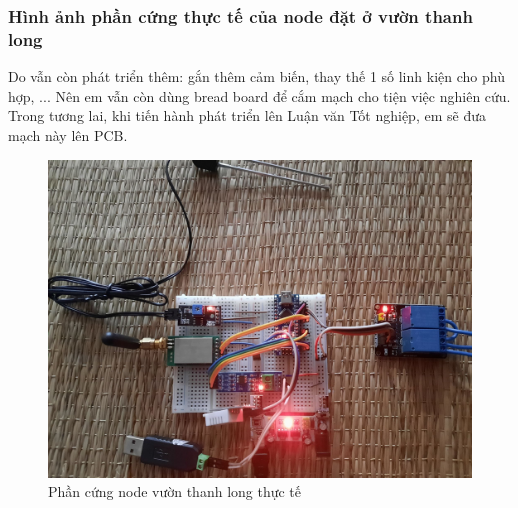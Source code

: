 \subsubsection{Hình ảnh phần cứng thực tế của node đặt ở vườn thanh long}
\indent Do vẫn còn phát triển thêm: gắn thêm cảm biến, thay thế 1 số linh kiện cho phù hợp, ... Nên em vẫn còn dùng bread board để cắm mạch cho tiện việc nghiên cứu. Trong tương lai, khi tiến hành phát triển lên Luận văn Tốt nghiệp, em sẽ đưa mạch này lên PCB.
\begin{figure}[H]
	\centering
	\includegraphics[scale=0.1]{Chapter 4/image chapter 4/phancung.jpg}
	\caption[Phần cứng node vườn thanh long thực tế]{Phần cứng node vườn thanh long thực tế}
	\label{hinh42}
\end{figure}
